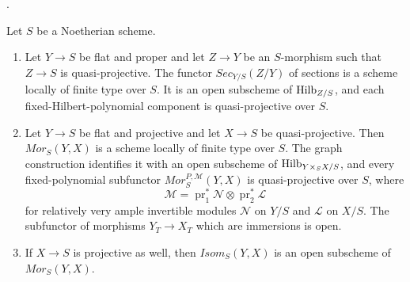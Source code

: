 \begin{proposition}
\label{proposition-sections-Mor-quasi-projective}
\begin{reference}
\cite[Expos\'e 221, Section 4(c), pp. 267--268]{FGA}.
\end{reference}
Let $S$ be a Noetherian scheme.
\begin{enumerate}
\item Let $Y \to S$ be flat and proper and let $Z \to Y$ be an
$S$-morphism such that $Z \to S$ is quasi-projective. The functor
$\mathit{Sec}_{Y/S}(Z/Y)$ of sections is a scheme locally of finite type
over $S$. It is an open subscheme of $\mathrm{Hilb}_{Z/S}$, and each
fixed-Hilbert-polynomial component is quasi-projective over $S$.
\item Let $Y \to S$ be flat and projective and let $X \to S$ be
quasi-projective. Then $\mathit{Mor}_S(Y, X)$ is a scheme locally of finite
type over $S$. The graph construction identifies it with an open subscheme
of $\mathrm{Hilb}_{Y \times_S X/S}$, and every fixed-polynomial subfunctor
$\mathit{Mor}^{P,\mathcal{M}}_S(Y, X)$ is quasi-projective over $S$, where
$$
\mathcal{M} = \operatorname{pr}_1^*\mathcal{N} \otimes
\operatorname{pr}_2^*\mathcal{L}
$$
for relatively very ample invertible modules $\mathcal{N}$ on $Y/S$ and
$\mathcal{L}$ on $X/S$. The subfunctor of morphisms $Y_T \to X_T$ which
are immersions is open.
\item If $X \to S$ is projective as well, then
$\mathit{Isom}_S(Y, X)$ is an open subscheme of
$\mathit{Mor}_S(Y, X)$.
\end{enumerate}
\end{proposition}

